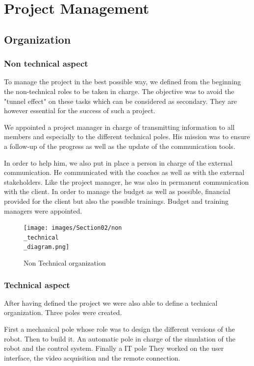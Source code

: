 \section{Project Management}\insertloftspace
\setcounter{figure}{0}\setcounter{table}{0}

\subsection{Organization}
\subsubsection{Non technical aspect}

To manage the project in the best possible way, we defined from the beginning the non-technical roles to be taken in charge. The objective was to avoid the "tunnel effect" on these tasks which can be considered as secondary. They are however essential for the success of such a project. 

\bigbreak
We appointed a project manager in charge of transmitting information to all members and especially to the different technical poles. His mission was to ensure a follow-up of the progress as well as the update of the communication tools. 

\bigbreak
In order to help him, we also put in place a person in charge of the external communication. He communicated with the coaches as well as with the external stakeholders. Like the project manager, he was also in permanent communication with the client. In order to manage the budget as well as possible, financial provided for the client but also the possible trainings. Budget and training managers were appointed. 

\begin{figure}[ht]
    \centering
    \texttt{[image: images/Section02/non\\\_technical\\\_diagram.png]}
    \caption{Non Technical organization}
    \label{fig:mesh2}
\end{figure}

\subsubsection{Technical aspect}

After having defined the project we were also able to define a technical organization. Three poles were created. 

\bigbreak
First a mechanical pole whose role was to design the different versions of the robot. Then to build it. An automatic pole in charge of the simulation of the robot and the control system. Finally a IT pole They worked on the user interface, the video acquisition and the remote connection.

